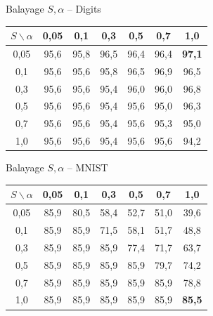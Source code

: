 \documentclass[10pt,aspectratio=169]{beamer}
\begin{document}
\begin{frame}{Balayage $S,\alpha$ -- Digits}
\begin{center}
\renewcommand{\arraystretch}{1.15}
\begin{tabular}{ccccccc}
\toprule
$S \backslash \alpha$ & 0,05 & 0,1 & 0,3 & 0,5 & 0,7 & 1,0 \\
\midrule
0,05 & 95,6 & 95,8 & 96,5 & 96,4 & 96,4 & \textbf{97,1} \\
0,1  & 95,6 & 95,6 & 95,8 & 96,5 & 96,9 & 96,5 \\
0,3  & 95,6 & 95,6 & 95,4 & 96,0 & 96,0 & 96,8 \\
0,5  & 95,6 & 95,6 & 95,4 & 95,6 & 95,0 & 96,3 \\
0,7  & 95,6 & 95,6 & 95,4 & 95,6 & 95,3 & 95,0 \\
1,0  & 95,6 & 95,6 & 95,4 & 95,6 & 95,6 & 94,2 \\
\bottomrule
\end{tabular}
\end{center}
\end{frame}

\begin{frame}{Balayage $S,\alpha$ -- MNIST}
\begin{center}
\renewcommand{\arraystretch}{1.15}
\begin{tabular}{ccccccc}
\toprule
$S \backslash \alpha$ & 0,05 & 0,1 & 0,3 & 0,5 & 0,7 & 1,0 \\
\midrule
0,05 & 85,9 & 80,5 & 58,4 & 52,7 & 51,0 & 39,6 \\
0,1  & 85,9 & 85,9 & 71,5 & 58,1 & 51,7 & 48,8 \\
0,3  & 85,9 & 85,9 & 85,9 & 77,4 & 71,7 & 63,7 \\
0,5  & 85,9 & 85,9 & 85,9 & 85,9 & 79,7 & 74,2 \\
0,7  & 85,9 & 85,9 & 85,9 & 85,9 & 85,9 & 78,8 \\
1,0  & 85,9 & 85,9 & 85,9 & 85,9 & 85,9 & \textbf{85,5} \\
\bottomrule
\end{tabular}
\end{center}
\end{frame}
\end{document}
